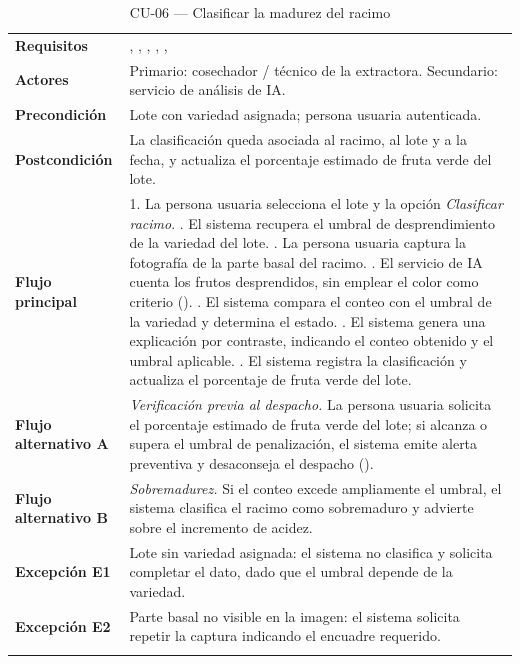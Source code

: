 \begin{longtable}{|L{3.4cm}|L{12.0cm}|}
\hline
{}\\
\hline
\textbf{Requisitos} & , , , , ,  \\ \hline
\textbf{Actores} & Primario: cosechador / técnico de la extractora. Secundario: servicio de análisis de IA. \\ \hline
\textbf{Precondición} & Lote con variedad asignada; persona usuaria autenticada. \\ \hline
\textbf{Postcondición} & La clasificación queda asociada al racimo, al lote y a la fecha, y actualiza el porcentaje estimado de fruta verde del lote. \\ \hline
\textbf{Flujo principal} & 1. La persona usuaria selecciona el lote y la opción \emph{Clasificar racimo}. . El sistema recupera el umbral de desprendimiento de la variedad del lote. . La persona usuaria captura la fotografía de la parte basal del racimo. . El servicio de IA cuenta los frutos desprendidos, sin emplear el color como criterio (). . El sistema compara el conteo con el umbral de la variedad y determina el estado. . El sistema genera una explicación por contraste, indicando el conteo obtenido y el umbral aplicable. . El sistema registra la clasificación y actualiza el porcentaje de fruta verde del lote. \\ \hline
\textbf{Flujo alternativo A} & \emph{Verificación previa al despacho.} La persona usuaria solicita el porcentaje estimado de fruta verde del lote; si alcanza o supera el umbral de penalización, el sistema emite alerta preventiva y desaconseja el despacho (). \\ \hline
\textbf{Flujo alternativo B} & \emph{Sobremadurez.} Si el conteo excede ampliamente el umbral, el sistema clasifica el racimo como sobremaduro y advierte sobre el incremento de acidez. \\ \hline
\textbf{Excepción E1} & Lote sin variedad asignada: el sistema no clasifica y solicita completar el dato, dado que el umbral depende de la variedad. \\ \hline
\textbf{Excepción E2} & Parte basal no visible en la imagen: el sistema solicita repetir la captura indicando el encuadre requerido. \\ \hline
\caption{CU-06 --- Clasificar la madurez del racimo}
\end{longtable}

